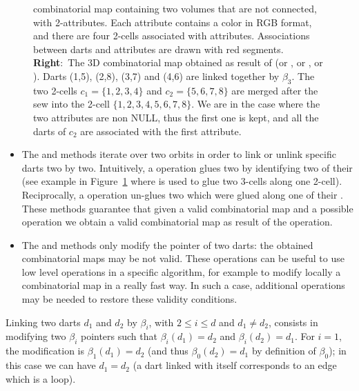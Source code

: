 \begin{figure}
{    combinatorial map containing two volumes that are not connected,
    with 2-attributes. Each attribute contains a color in RGB format,
    and there are four 2-cells associated with attributes.
    Associations between darts and attributes are drawn with red
    segments. \textbf{Right}:~The 3D combinatorial map obtained as
    result of  (or , or
    , or ). Darts (1,5), (2,8),
    (3,7) and (4,6) are linked together by $\beta_3$. The two 2-cells
    $c_1=\{1,2,3,4\}$ and $c_2=\{5,6,7,8\}$ are merged after the sew
    into the 2-cell $\{1,2,3,4,5,6,7,8\}$. We are in the case where
    the two attributes are non NULL, thus the first one is kept, and
    all the darts of $c_2$ are associated with the first attribute.}
  \label{fig-exemple-sew}
\end{figure}
\begin{itemize}
\item The  and  methods iterate over two orbits in
  order to link or unlink specific darts two by two.  Intuitively, a
   operation glues two  by identifying two of
  their  (see example in Figure~\ref{fig-exemple-sew}
  where  is used to glue two 3-cells along one 2-cell).
  Reciprocally, a  operation un-glues two  which
  were glued along one of their .
  These methods guarantee that given a valid combinatorial map and a
  possible operation we obtain a valid combinatorial map as result of
  the operation.

\item
\begin{ccAdvanced}
The  and  methods only modify
  the pointer of two darts: the obtained combinatorial maps may be not
  valid. These operations can be useful to use low level operations
  in a specific algorithm, for example to modify locally a
  combinatorial map in a really fast way. In such a case, additional
  operations may be needed to restore these validity conditions.
\end{ccAdvanced}
\end{itemize}

Linking two darts $d_1$ and $d_2$ by $\beta_i$, with $2\leq i\leq d$
and $d_1 \neq d_2$, consists in modifying two $\beta_i$ pointers such that
$\beta_i(d_1)=d_2$ and $\beta_i(d_2)=d_1$. For $i=1$, the modification
is $\beta_1(d_1)=d_2$ (and thus $\beta_0(d_2)=d_1$ by definition of
$\beta_0$); in this case we can have $d_1=d_2$ (a dart linked with
itself corresponds to an edge which is a loop).

